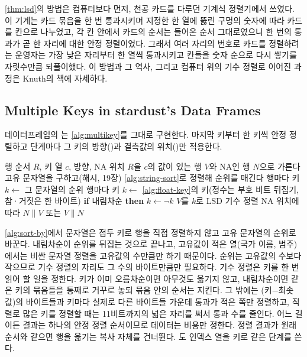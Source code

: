 \begin{aside}[천공 카드 정렬기]
\cref{thm:lsd}의 방법은 컴퓨터보다 먼저, 천공 카드를 다루던 기계식 정렬기에서 쓰였다. 이 기계는 카드 묶음을 한 번 통과시키며 지정한 한 열에 뚫린 구멍의 숫자에 따라 카드를 칸으로 나누었고, 각 칸 안에서 카드의 순서는 들어온 순서 그대로였으니 한 번의 통과가 곧 한 자리에 대한 안정 정렬이었다. 그래서 여러 자리의 번호로 카드를 정렬하려는 운영자는 가장 낮은 자리부터 한 열씩 통과시키고 칸들을 숫자 순으로 다시 쌓기를 자릿수만큼 되풀이했다. 이 방법과 그 역사, 그리고 컴퓨터 위의 기수 정렬로 이어진 과정은 Knuth의 책에 자세하다\cite{knuth1998taocp3}.
\end{aside}

\subsection{Multiple Keys in stardust's Data Frames}

데이터프레임의 는 \cref{alg:multikey}를 그대로 구현한다. 마지막 키부터 한 키씩 안정 정렬하고 단계마다 그 키의 방향()과 결측값의 위치()만 적용한다.

\begin{algorithm}[htbp]
\begin{algorithmic}[1]
\Require 행 순서 $R$, 키 열 $c$, 방향, NA 위치
\State $R$을 $c$의 값이 있는 행 $V$와 NA인 행 $N$으로 가른다 
  \State 고유 문자열을 구하고(해시, 19장) \cref{alg:string-sort}로 정렬해 순위를 매긴다
  \State 행마다 키 $k\gets$ 그 문자열의 순위
\Else
  \State 행마다 키 $k\gets$ \cref{alg:float-key}의 키(정수는 부호 비트 뒤집기, 참·거짓은 한 바이트)
\EndIf
\State \textbf{if} 내림차순 \textbf{then} $k\gets\lnot k$
\State $V$를 $k$로 LSD 기수 정렬 
\State \Return NA 위치에 따라 $N\|V$ 또는 $V\|N$
\end{algorithmic}
\caption{데이터프레임 정렬의 한 단계 (stardust )}
\label{alg:sort-by}
\end{algorithm}

\cref{alg:sort-by}에서 문자열은 접두 키로 행을 직접 정렬하지 않고 고유 문자열의 순위로 바꾼다. 내림차순이 순위를 뒤집는 것으로 끝나고, 고유값이 적은 열(국가 이름, 범주)에서는 비싼 문자열 정렬을 고유값의 수만큼만 하기 때문이다. 순위는 고유값의 수보다 작으므로 기수 정렬의 자리도 그 수의 바이트만큼만 필요하다. 기수 정렬은 키를 한 번 읽어 할 일을 정한다. 키가 이미 오름차순이면 아무것도 옮기지 않고, 내림차순이면 같은 키의 묶음들을 통째로 거꾸로 놓되 묶음 안의 순서는 지킨다. 그 밖에는 (키$-$최솟값)의 바이트들과 키마다 실제로 다른 바이트들 가운데 통과가 적은 쪽만 정렬하고, 직렬로 많은 키를 정렬할 때는 11비트까지의 넓은 자리를 써서 통과 수를 줄인다. 어느 길이든 결과는 하나의 안정 정렬 순서이므로 데이터는 비용만 정한다. 정렬 결과가 원래 순서와 같으면 행을 옮기는 복사 자체를 건너뛴다. 도 인덱스 열을 키로 같은 단계를 쓴다.

